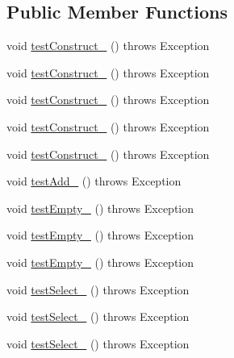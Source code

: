 \subsection*{Public Member Functions}
\begin{DoxyCompactItemize}
\item 
void \hyperlink{classorg_1_1jgap_1_1impl_1_1_tournament_selector_test_a10f1573f3a998f75ade75cf6ea93fc39}{test\-Construct\-\_} ()  throws Exception 
\item 
void \hyperlink{classorg_1_1jgap_1_1impl_1_1_tournament_selector_test_ab3406afe723b2df932fde3a69f19b90b}{test\-Construct\-\_} ()  throws Exception 
\item 
void \hyperlink{classorg_1_1jgap_1_1impl_1_1_tournament_selector_test_ad40746c49dc156a4cc593b0146b99c71}{test\-Construct\-\_} ()  throws Exception 
\item 
void \hyperlink{classorg_1_1jgap_1_1impl_1_1_tournament_selector_test_adeb1ad91fa6caa7adc67f978d4cc091b}{test\-Construct\-\_} ()  throws Exception 
\item 
void \hyperlink{classorg_1_1jgap_1_1impl_1_1_tournament_selector_test_a307ad12aa571f945d0da0e7c46da79f1}{test\-Construct\-\_} ()  throws Exception 
\item 
void \hyperlink{classorg_1_1jgap_1_1impl_1_1_tournament_selector_test_a34e14093d113bec952b5e10fba57b2a3}{test\-Add\-\_} ()  throws Exception 
\item 
void \hyperlink{classorg_1_1jgap_1_1impl_1_1_tournament_selector_test_ad6a33492fd301dace0ee73b1cde3b9e0}{test\-Empty\-\_} ()  throws Exception 
\item 
void \hyperlink{classorg_1_1jgap_1_1impl_1_1_tournament_selector_test_ab0ce71f14227a4795e2c6ebb511200c1}{test\-Empty\-\_} ()  throws Exception 
\item 
void \hyperlink{classorg_1_1jgap_1_1impl_1_1_tournament_selector_test_a90a6af91f92d781fe04de7354576cd08}{test\-Empty\-\_} ()  throws Exception 
\item 
void \hyperlink{classorg_1_1jgap_1_1impl_1_1_tournament_selector_test_a24657892ce7b474a8ac762cb806c1e6d}{test\-Select\-\_} ()  throws Exception 
\item 
void \hyperlink{classorg_1_1jgap_1_1impl_1_1_tournament_selector_test_a6e9b0725f55b2f4672381343b52a41ba}{test\-Select\-\_} ()  throws Exception 
\item 
void \hyperlink{classorg_1_1jgap_1_1impl_1_1_tournament_selector_test_aa182188a35646919f63dc1c6d68d0d38}{test\-Select\-\_} ()  throws Exception 

\end{DoxyCompactItemize}
